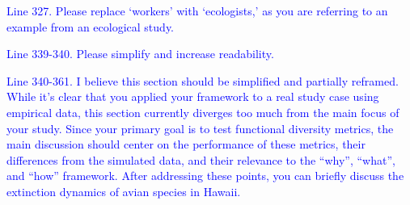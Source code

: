 \documentclass[
]{article}
\begin{document}
\textcolor{blue}{Line 327. Please replace `workers' with `ecologists,' as you are referring to an example from an ecological study.}

\textcolor{blue}{Line 339-340. Please simplify and increase readability.}

\textcolor{blue}{Line 340-361. I believe this section should be simplified and partially reframed.
While it's clear that you applied your framework to a real study case using empirical data, this section currently diverges too much from the main focus of your study.
Since your primary goal is to test functional diversity metrics, the main discussion should center on the performance of these metrics, their differences from the simulated data, and their relevance to the ``why'', ``what'', and ``how'' framework.
After addressing these points, you can briefly discuss the extinction dynamics of avian species in Hawaii.}
\end{document}
